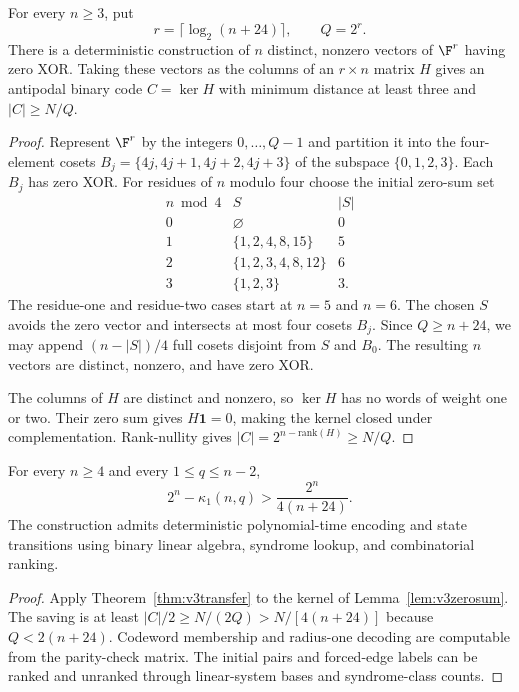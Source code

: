 \begin{lemma}\label{lem:v3zerosum}
For every $n\ge3$, put
\[
 r=\lceil\log_2(n+24)\rceil,\qquad Q=2^r.
\]
There is a deterministic construction of $n$ distinct, nonzero vectors of $\F^r$ having zero XOR. Taking these vectors as the columns of an $r\times n$ matrix $H$ gives an antipodal binary code $C=\ker H$ with minimum distance at least three and $|C|\ge N/Q$.
\end{lemma}
\begin{proof}
Represent $\F^r$ by the integers $0,\ldots,Q-1$ and partition it into the four-element cosets $B_j=\{4j,4j+1,4j+2,4j+3\}$ of the subspace $\{0,1,2,3\}$. Each $B_j$ has zero XOR. For residues of $n$ modulo four choose the initial zero-sum set
\[
\begin{array}{c|c|c}
n\bmod4&S&|S|\\ \hline
0&\varnothing&0\\
1&\{1,2,4,8,15\}&5\\
2&\{1,2,3,4,8,12\}&6\\
3&\{1,2,3\}&3.
\end{array}
\]
The residue-one and residue-two cases start at $n=5$ and $n=6$. The chosen $S$ avoids the zero vector and intersects at most four cosets $B_j$. Since $Q\ge n+24$, we may append $(n-|S|)/4$ full cosets disjoint from $S$ and $B_0$. The resulting $n$ vectors are distinct, nonzero, and have zero XOR.

The columns of $H$ are distinct and nonzero, so $\ker H$ has no words of weight one or two. Their zero sum gives $H\mathbf1=0$, making the kernel closed under complementation. Rank-nullity gives $|C|=2^{n-\mathrm{rank}(H)}\ge N/Q$.
\end{proof}

\begin{corollary}\label{cor:v3all}
For every $n\ge4$ and every $1\le q\le n-2$,
\[
 \boxed{\qquad 2^n-\kappa_1(n,q)>\frac{2^n}{4(n+24)}.\qquad}
\]
The construction admits deterministic polynomial-time encoding and state transitions using binary linear algebra, syndrome lookup, and combinatorial ranking.
\end{corollary}
\begin{proof}
Apply Theorem~\ref{thm:v3transfer} to the kernel of Lemma~\ref{lem:v3zerosum}. The saving is at least $|C|/2\ge N/(2Q)>N/[4(n+24)]$ because $Q<2(n+24)$. Codeword membership and radius-one decoding are computable from the parity-check matrix. The initial pairs and forced-edge labels can be ranked and unranked through linear-system bases and syndrome-class counts.
\end{proof}

